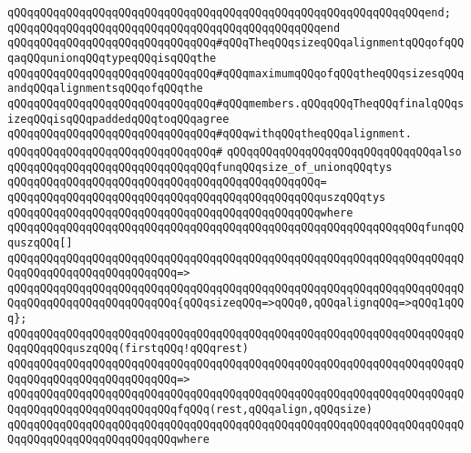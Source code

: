 \verb|qQQqqQQqqQQqqQQqqQQqqQQqqQQqqQQqqQQqqQQqqQQqqQQqqQQqqQQqqQQqqQQqend;|\newline
\verb|qQQqqQQqqQQqqQQqqQQqqQQqqQQqqQQqqQQqqQQqqQQqqQQqend|\newline
\newline
\verb|qQQqqQQqqQQqqQQqqQQqqQQqqQQqqQQq#qQQqTheqQQqsizeqQQqalignmentqQQqofqQQqaqQQqunionqQQqtypeqQQqisqQQqthe|\newline
\verb|qQQqqQQqqQQqqQQqqQQqqQQqqQQqqQQq#qQQqmaximumqQQqofqQQqtheqQQqsizesqQQqandqQQqalignmentsqQQqofqQQqthe|\newline
\verb|qQQqqQQqqQQqqQQqqQQqqQQqqQQqqQQq#qQQqmembers.qQQqqQQqTheqQQqfinalqQQqsizeqQQqisqQQqpaddedqQQqtoqQQqagree|\newline
\verb|qQQqqQQqqQQqqQQqqQQqqQQqqQQqqQQq#qQQqwithqQQqtheqQQqalignment.|\newline
\verb|qQQqqQQqqQQqqQQqqQQqqQQqqQQqqQQq#|\newline
\verb|qQQqqQQqqQQqqQQqqQQqqQQqqQQqqQQqalso|\newline
\verb|qQQqqQQqqQQqqQQqqQQqqQQqqQQqqQQqfunqQQqsize_of_unionqQQqtys|\newline
\verb|qQQqqQQqqQQqqQQqqQQqqQQqqQQqqQQqqQQqqQQqqQQqqQQq=|\newline
\verb|qQQqqQQqqQQqqQQqqQQqqQQqqQQqqQQqqQQqqQQqqQQqqQQquszqQQqtys|\newline
\verb|qQQqqQQqqQQqqQQqqQQqqQQqqQQqqQQqqQQqqQQqqQQqqQQqwhere|\newline
\verb|qQQqqQQqqQQqqQQqqQQqqQQqqQQqqQQqqQQqqQQqqQQqqQQqqQQqqQQqqQQqqQQqfunqQQquszqQQq[]|\newline
\verb|qQQqqQQqqQQqqQQqqQQqqQQqqQQqqQQqqQQqqQQqqQQqqQQqqQQqqQQqqQQqqQQqqQQqqQQqqQQqqQQqqQQqqQQqqQQqqQQq=>|\newline
\verb|qQQqqQQqqQQqqQQqqQQqqQQqqQQqqQQqqQQqqQQqqQQqqQQqqQQqqQQqqQQqqQQqqQQqqQQqqQQqqQQqqQQqqQQqqQQqqQQq{qQQqsizeqQQq=>qQQq0,qQQqalignqQQq=>qQQq1qQQq};|\newline
\newline
\verb|qQQqqQQqqQQqqQQqqQQqqQQqqQQqqQQqqQQqqQQqqQQqqQQqqQQqqQQqqQQqqQQqqQQqqQQqqQQqqQQquszqQQq(firstqQQq!qQQqrest)|\newline
\verb|qQQqqQQqqQQqqQQqqQQqqQQqqQQqqQQqqQQqqQQqqQQqqQQqqQQqqQQqqQQqqQQqqQQqqQQqqQQqqQQqqQQqqQQqqQQqqQQq=>|\newline
\verb|qQQqqQQqqQQqqQQqqQQqqQQqqQQqqQQqqQQqqQQqqQQqqQQqqQQqqQQqqQQqqQQqqQQqqQQqqQQqqQQqqQQqqQQqqQQqqQQqfqQQq(rest,qQQqalign,qQQqsize)|\newline
\verb|qQQqqQQqqQQqqQQqqQQqqQQqqQQqqQQqqQQqqQQqqQQqqQQqqQQqqQQqqQQqqQQqqQQqqQQqqQQqqQQqqQQqqQQqqQQqqQQqwhere|\newline
